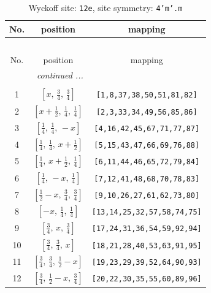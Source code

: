 \documentclass[fleqn,8pt]{jsarticle}
\begin{document}
\begin{longtable}{ccc}
\caption{Wyckoff site: {\tt 12e}, site symmetry: {\tt 4'm'.m}}
 \\
 \hline \hline
No. & position & mapping \\ \hline \endfirsthead

\multicolumn{2}{l}{\tablename\ \thetable{}} \\
 \hline \hline
No. & position & mapping \\ \hline \endhead

 \hline \hline
\multicolumn{2}{r}{\footnotesize\it continued ...} \\ \endfoot

 \hline \hline
\multicolumn{2}{r}{} \\ \endlastfoot

1 & $\left[ x,\, \frac{3}{4},\, \frac{3}{4} \right]$ & {\tt [1,8,37,38,50,51,81,82]} \\ \hline
2 & $\left[ x + \frac{1}{2},\, \frac{1}{4},\, \frac{1}{4} \right]$ & {\tt [2,3,33,34,49,56,85,86]} \\ \hline
3 & $\left[ \frac{1}{4},\, \frac{1}{4},\, - x \right]$ & {\tt [4,16,42,45,67,71,77,87]} \\ \hline
4 & $\left[ \frac{1}{4},\, \frac{1}{4},\, x + \frac{1}{2} \right]$ & {\tt [5,15,43,47,66,69,76,88]} \\ \hline
5 & $\left[ \frac{1}{4},\, x + \frac{1}{2},\, \frac{1}{4} \right]$ & {\tt [6,11,44,46,65,72,79,84]} \\ \hline
6 & $\left[ \frac{1}{4},\, - x,\, \frac{1}{4} \right]$ & {\tt [7,12,41,48,68,70,78,83]} \\ \hline
7 & $\left[ \frac{1}{2} - x,\, \frac{3}{4},\, \frac{3}{4} \right]$ & {\tt [9,10,26,27,61,62,73,80]} \\ \hline
8 & $\left[ - x,\, \frac{1}{4},\, \frac{1}{4} \right]$ & {\tt [13,14,25,32,57,58,74,75]} \\ \hline
9 & $\left[ \frac{3}{4},\, x,\, \frac{3}{4} \right]$ & {\tt [17,24,31,36,54,59,92,94]} \\ \hline
10 & $\left[ \frac{3}{4},\, \frac{3}{4},\, x \right]$ & {\tt [18,21,28,40,53,63,91,95]} \\ \hline
11 & $\left[ \frac{3}{4},\, \frac{3}{4},\, \frac{1}{2} - x \right]$ & {\tt [19,23,29,39,52,64,90,93]} \\ \hline
12 & $\left[ \frac{3}{4},\, \frac{1}{2} - x,\, \frac{3}{4} \right]$ & {\tt [20,22,30,35,55,60,89,96]} \\
\end{longtable}
\end{document}

